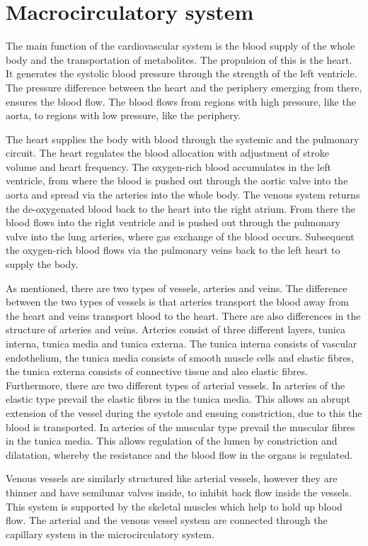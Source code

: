 

\section{Macrocirculatory system}
The main function of the cardiovascular system is the blood supply of the whole body and the transportation of metabolites. The propulsion of this is the heart. It generates the systolic blood pressure through the strength of the left ventricle. The pressure difference between the heart and the periphery emerging from there, ensures the blood flow. The blood flows from regions with high pressure, like the aorta, to regions with low pressure, like the periphery.\cite{martini2012}

The heart supplies the body with blood through the systemic and the pulmonary circuit. The heart regulates the blood allocation with adjustment of stroke volume and heart frequency. The oxygen-rich blood accumulates in the left ventricle, from where the blood is pushed out through the aortic valve into the aorta and spread via the arteries into the whole body. The venous system returns the de-oxygenated blood back to the heart into the right atrium. From there the blood flows into the right ventricle and is pushed out through the pulmonary valve into the lung arteries, where gas exchange of the blood occurs. Subsequent the oxygen-rich blood flows via the pulmonary veins back to the left heart to supply the body.\cite{martini2012}

As mentioned, there are two types of vessels, arteries and veins. The difference between the two types of vessels is that arteries transport the blood away from the heart and veins transport blood to the heart. There are also differences in the structure of arteries and veins.
Arteries consist of three different layers, tunica interna, tunica media and tunica externa. The tunica interna consists of vascular endothelium, the tunica media consists of smooth muscle cells and elastic fibres, the tunica externa consists of connective tissue and also elastic fibres. Furthermore, there are two different types of arterial vessels. In arteries of the elastic type prevail the elastic fibres in the tunica media. This allows an abrupt extension of the vessel during the systole and ensuing constriction, due to this the blood is transported. In arteries of the muscular type prevail the muscular fibres in the tunica media. This allows regulation of the lumen by constriction and dilatation, whereby the resistance and the blood flow in the organs is regulated.\cite{martini2012}

Venous vessels are similarly structured like arterial vessels, however they are thinner and have semilunar valves inside, to inhibit back flow inside the vessels. This system is supported by the skeletal muscles which help to hold up blood flow. The arterial and the venous vessel system are connected through the capillary system in the microcirculatory system.\cite{martini2012}
